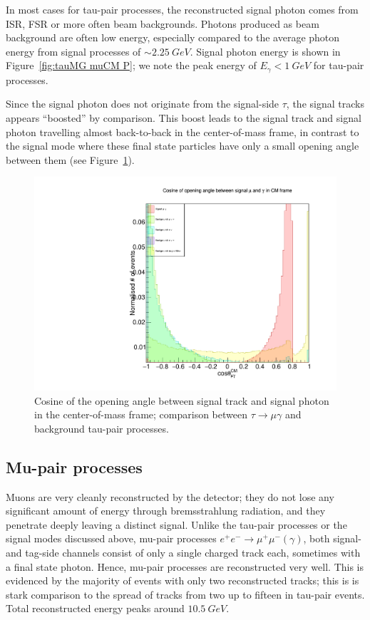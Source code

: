 \documentclass[12pt]{thesis}  %
\begin{document}
In most cases for tau-pair processes, the reconstructed signal photon comes from ISR, FSR or more often beam backgrounds. Photons produced as beam background are often low energy, especially compared to the average photon energy from signal processes of $\sim \SI{2.25}{GeV}$. Signal photon energy is shown in Figure~\ref{fig:tauMG muCM P}; we note the peak energy of $E_{\gamma}<\SI{1}{GeV}$ for tau-pair processes. 

Since the signal photon does not originate from the signal-side $\tau$, the signal tracks appears ``boosted'' by comparison. This boost leads to the signal track and signal photon travelling almost back-to-back in the center-of-mass frame, in contrast to the signal mode where these final state particles have only a small opening angle between them (see Figure~\ref{fig:taupair muGammaOpeningCosThetaCM}). 

\begin{figure}
\centering
\includegraphics[width=0.45\linewidth]{images/taupair-muGammaOpeningCM.pdf}
\caption[]%
{{\small Cosine of the opening angle between signal track and signal photon in the center-of-mass frame; comparison between $\tau\to\mu\gamma$ and background tau-pair processes.}}    
\label{fig:taupair muGammaOpeningCosThetaCM}
\end{figure}


\subsection{Mu-pair processes}

Muons are very cleanly reconstructed by the detector; they do not lose any significant amount of energy through bremsstrahlung radiation, and they penetrate deeply leaving a distinct signal. Unlike the tau-pair processes or the signal modes discussed above, mu-pair processes $e^+ e^- \to \mu^+ \mu^- (\gamma)$, both signal- and tag-side channels consist of only a single charged track each, sometimes with a final state photon. Hence, mu-pair processes are reconstructed very well. This is evidenced by the majority of events with only two reconstructed tracks; this is is stark comparison to the spread of tracks from two up to fifteen in tau-pair events. Total reconstructed energy peaks around $\SI{10.5}{GeV}$.
\end{document}
